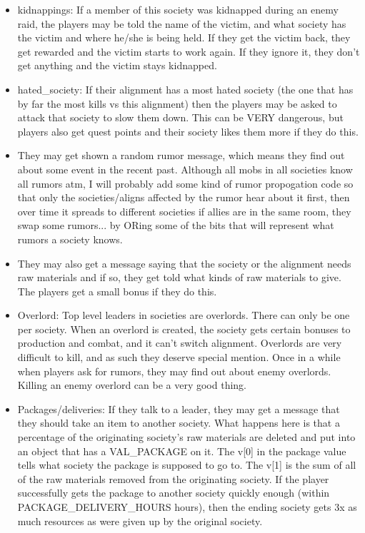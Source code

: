 \begin{itemize}

\item kidnappings: If a member of this society was kidnapped during an enemy
  raid, the players may be told the name of the victim, and what society
  has the victim and where he/she is being held. If they get the victim back,
  they get rewarded and the victim starts to work again. If they ignore it,
  they don't get anything and the victim stays kidnapped.

\item hated\_society: If their alignment has a most hated society (the one
  that has by far the most kills vs this alignment) then the players
  may be asked to attack that society to slow them down. This can be 
  VERY dangerous, but players also get quest points and their society
  likes them more if they do this.

\item They may get shown a random rumor message, which means they find
  out about some event in the recent past. Although all mobs in all societies
  know all rumors atm, I will probably add some kind of rumor 
  propogation code so that only the societies/aligns affected by
  the rumor hear about it first, then over time it spreads to different
  societies if allies are in the same room, they swap some rumors...
  by ORing some of the bits that will represent what rumors a society 
  knows.

\item They may also get a message saying that the society or the alignment
  needs raw materials and if so, they get told what kinds of raw
  materials to give. The players get a small bonus if they do this.

\item Overlord: Top level leaders in societies are overlords. There can only
  be one per society. When an overlord is created, the society gets certain
  bonuses to production and combat, and it can't switch alignment. Overlords
  are very difficult to kill, and as such they deserve special mention. Once
  in a while when players ask for rumors, they may find out about enemy
  overlords. Killing an enemy overlord can be a very good thing.


\item Packages/deliveries: If they talk to a leader, they may get a message
  that they should take an item to another society. What happens here is that
  a percentage of the originating society's raw materials are deleted and put
  into an object that has a VAL\_PACKAGE on it. The v[0] in the package value
  tells what society the package is supposed to go to. The v[1] is the sum of
  all of the raw materials removed from the originating society. If the player
  successfully gets the package to another society quickly enough (within
  PACKAGE\_DELIVERY\_HOURS hours), then the ending society gets 3x as much
  resources as were given up by the original society.

\end{itemize}

